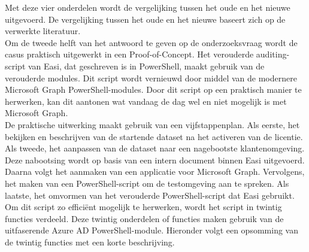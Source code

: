 Met deze vier onderdelen wordt de vergelijking tussen het oude en het nieuwe uitgevoerd. De vergelijking tussen het oude en het nieuwe baseert zich op de verwerkte literatuur. \\

Om de tweede helft van het antwoord te geven op de onderzoeksvraag wordt de casus praktisch uitgewerkt in een Proof-of-Concept. Het verouderde auditing-script van Easi, dat geschreven is in PowerShell, maakt gebruik van de verouderde modules. Dit script wordt vernieuwd door middel van de modernere Microsoft Graph PowerShell-modules. Door dit script op een praktisch manier te herwerken, kan dit aantonen wat vandaag de dag wel en niet mogelijk is met Microsoft Graph. \\

De praktische uitwerking maakt gebruik van een vijfstappenplan. Als eerste, het bekijken en beschrijven van de startende dataset na het activeren van de licentie. Als tweede, het aanpassen van de dataset naar een nagebootste klantenomgeving. Deze nabootsing wordt op basis van een intern document binnen Easi uitgevoerd. Daarna volgt het aanmaken van een applicatie voor Microsoft Graph. Vervolgens, het maken van een PowerShell-script om de testomgeving aan te spreken. Als laatste, het omvormen van het verouderde PowerShell-script dat Easi gebruikt. \\

Om dit script zo efficiënt mogelijk te herwerken, wordt het script in twintig functies verdeeld. Deze twintig onderdelen of functies maken gebruik van de uitfaserende Azure \ac{AD} PowerShell-module. Hieronder volgt een opsomming van de twintig functies met een korte beschrijving. 

